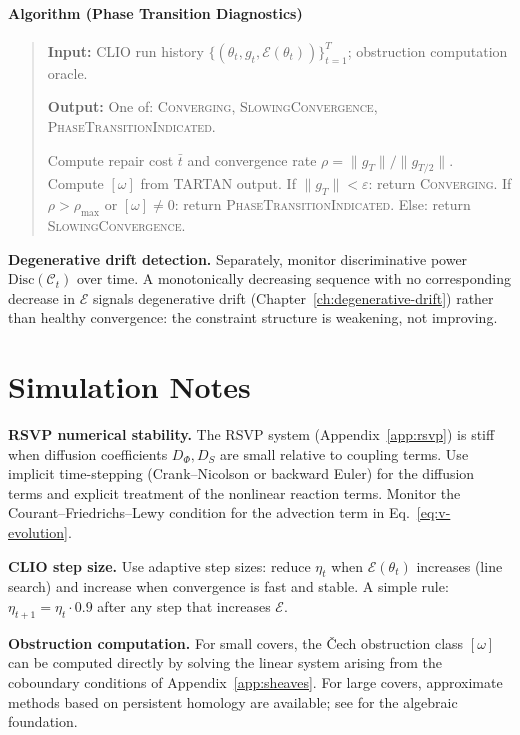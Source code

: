 \documentclass[11pt,openany]{book}
\begin{document}
\paragraph{Algorithm (Phase Transition Diagnostics)}\label{alg:diagnostics}

\begin{quote}
\textbf{Input:} CLIO run history $\{(\theta_t, g_t, \mathcal{E}(\theta_t))\}_{t=1}^T$; obstruction computation oracle.

\textbf{Output:} One of: \textsc{Converging}, \textsc{SlowingConvergence}, \textsc{PhaseTransitionIndicated}.

Compute repair cost $\bar{t}$ and convergence rate $\rho = \|g_T\| / \|g_{T/2}\|$. Compute $[\omega]$ from TARTAN output. If $\|g_T\| < \varepsilon$: return \textsc{Converging}. If $\rho > \rho_{\max}$ or $[\omega] \neq 0$: return \textsc{PhaseTransitionIndicated}. Else: return \textsc{SlowingConvergence}.
\end{quote}


\textbf{Degenerative drift detection.}  Separately, monitor
discriminative power $\mathrm{Disc}(\mathcal{C}_t)$ over
time.  A monotonically decreasing sequence with no
corresponding decrease in $\mathcal{E}$ signals degenerative
drift (Chapter~\ref{ch:degenerative-drift}) rather than
healthy convergence: the constraint structure is weakening,
not improving.

\section{Simulation Notes}
\label{sec:simulation-notes}

\textbf{RSVP numerical stability.}  The RSVP system
(Appendix~\ref{app:rsvp}) is stiff when diffusion
coefficients $D_\Phi, D_S$ are small relative to coupling
terms.  Use implicit time-stepping (Crank--Nicolson or
backward Euler) for the diffusion terms and explicit
treatment of the nonlinear reaction terms.  Monitor the
Courant--Friedrichs--Lewy condition for the advection term
in Eq.~\eqref{eq:v-evolution}.

\textbf{CLIO step size.}  Use adaptive step sizes: reduce
$\eta_t$ when $\mathcal{E}(\theta_t)$ increases (line
search) and increase when convergence is fast and stable.
A simple rule: $\eta_{t+1} = \eta_t \cdot 0.9$ after any
step that increases $\mathcal{E}$.

\textbf{Obstruction computation.}  For small covers, the
Čech obstruction class $[\omega]$ can be computed directly
by solving the linear system arising from the coboundary
conditions of Appendix~\ref{app:sheaves}.  For large
covers, approximate methods based on persistent homology
are available; see \citep{bredon1997sheaf} for the
algebraic foundation.
\end{document}
